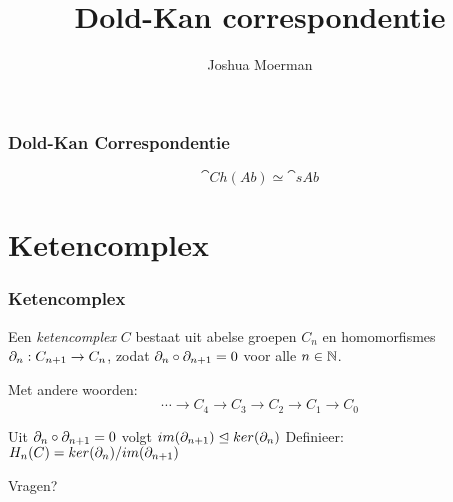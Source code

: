 \documentclass[14pt]{beamer}
\title{Dold-Kan correspondentie}
\author{Joshua Moerman}
\institute[Radboud Universiteit Nijmegen]{Begeleid door Moritz Groth}
\date{}
\begin{document}
\begin{frame}
  \titlepage
\end{frame}

\begin{frame}
\frametitle{Dold-Kan Correspondentie}
\huge $$ \cat{Ch(Ab)} \simeq \cat{sAb} $$
\end{frame}

\section{Ketencomplex}
\begin{frame}
\frametitle{Ketencomplex}
\begin{definition}
	Een \emph{ketencomplex} $C$ bestaat uit abelse groepen $C_n$ en homomorfismes $\partial_n : C_{n+1} \to C_n$, zodat $\partial_n \circ \partial_{n+1} = 0$ voor alle $n \in \mathbb{N}$.
\end{definition}
\pause
\bigskip
Met andere woorden:
$$ \cdots \to C_4 \to C_3 \to C_2 \to C_1 \to C_0 $$
\end{frame}

\begin{frame}
Uit $\partial_n \circ \partial_{n+1} = 0$ volgt $im(\partial_{n+1}) \trianglelefteq ker(\partial_n)$
\pause
Definieer: $H_n(C) = ker(\partial_n) / im(\partial_{n+1})$
\end{frame}

\begin{frame}
\begin{center}
\Huge Vragen?
\end{center}
\end{frame}
\end{document}
